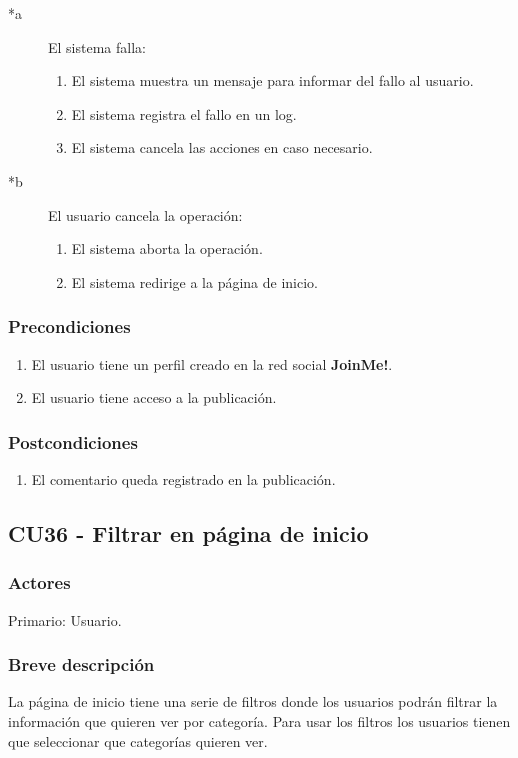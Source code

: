 \documentclass[12pt, a4paper, titlepage]{article}
\begin{document}
\begin{description}
	\item [*a] El sistema falla:
	\begin{enumerate}
		\item El sistema muestra un mensaje para informar del fallo al usuario.
		\item El sistema registra el fallo en un log.
		\item El sistema cancela las acciones en caso necesario.
	\end{enumerate}
\end{description}

\begin{description}
	\item [*b] El usuario cancela la operación:
	\begin{enumerate}
		\item El sistema aborta la operación.
		\item El sistema redirige a la página de inicio.
	\end{enumerate}
\end{description}

\subsubsection{Precondiciones}
\begin{enumerate}
	\item El usuario tiene un perfil creado en la red social \textbf{JoinMe!}.
	\item El usuario tiene acceso a la publicación.
\end{enumerate}
\subsubsection{Postcondiciones}
\begin{enumerate}
	\item El comentario queda registrado en la publicación.
\end{enumerate}


\subsection{CU36 - Filtrar en página de inicio}
\subsubsection{Actores}
Primario: Usuario.
\subsubsection{Breve descripción}
La página de inicio tiene una serie de filtros donde los usuarios podrán filtrar la información que quieren ver por categoría. Para usar los filtros los usuarios tienen que seleccionar que categorías quieren ver.
\end{document}
